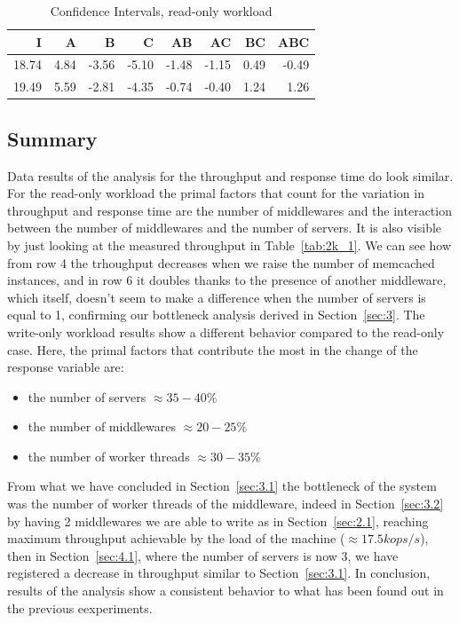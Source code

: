 \documentclass[11pt,a4paper]{article}
\begin{document}
\begin{table}[!htb]
\centering
    \caption{Confidence Intervals, read-only workload}
    \label{tab:2k_1_c}
    \begin{tabular}{|r|r|r|r|r|r|r|r|}
  \hline
         \textbf{I}        & \textbf{A}       & \textbf{B}       & \textbf{C}       & \textbf{AB}      & \textbf{AC}      &\textbf{BC}       & \textbf{ABC}    \\
  \hline 18.74 & 4.84 & -3.56 & -5.10 & -1.48 & -1.15 & 0.49 & -0.49 \\
        \hline 19.49 & 5.59 & -2.81 & -4.35 & -0.74 & -0.40 & 1.24 & 1.26 \\
  \hline
\end{tabular}
\end{table}

\subsection{Summary}

Data results of the analysis for the throughput and response time do look similar.
For the read-only workload the primal factors that count for the variation in throughput and response time are the number of middlewares and the interaction between the number of middlewares and the number of servers. It is also visible by just looking at the measured throughput in Table~\ref{tab:2k_1}. We can see how from row 4 the trhoughput decreases when we raise the number of memcached instances, and in row 6 it doubles thanks to the presence of another middleware, which itself, doesn't seem to make a difference when the number of servers is equal to 1, confirming our bottleneck analysis derived in Section~\ref{sec:3}.
The write-only workload results show a different behavior compared to the read-only case. Here, the primal factors that contribute the most in the change of the response variable are:
\begin{itemize}
    \item the number of servers $\approx 35-40\%$
    \item the number of middlewares $\approx20-25\%$
    \item the number of worker threads $\approx30-35\%$
\end{itemize}
From what we have concluded in Section~\ref{sec:3.1} the bottleneck of the system was the number of worker threads of the middleware, indeed in Section~\ref{sec:3.2} by having 2 middlewares we are able to write as in Section~\ref{sec:2.1}, reaching maximum throughput achievable by the load of the machine ($\approx 17.5k ops/s$), then in Section~\ref{sec:4.1}, where the number of servers is now 3, we have registered a decrease in throughput similar to Section~\ref{sec:3.1}. 
In conclusion, results of the analysis show a consistent behavior to what has been found out in the previous eexperiments.
\end{document}

